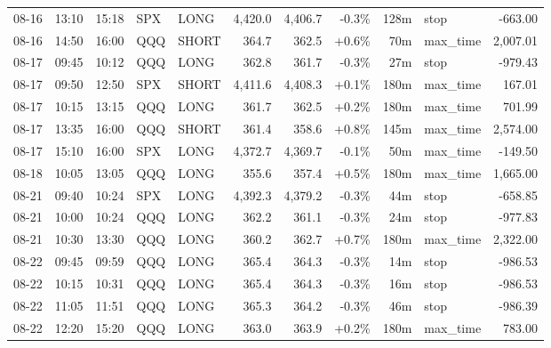 \documentclass[11pt,a4paper,twoside]{article}
\begin{document}
\begin{center}
\begin{longtable}{>{\color{txtmain}}l l l l l r r r r >{\color{txtmain}}l r}
08-16 & 13:10 & 15:18 & SPX & LONG & 4,420.0 & 4,406.7 & \textcolor{lossred}{-0.3\%} & 128m & stop & \textcolor{lossred}{-663.00} \\
08-16 & 14:50 & 16:00 & QQQ & SHORT & 364.7 & 362.5 & \textcolor{wingreen}{+0.6\%} & 70m & max\_time & \textcolor{wingreen}{2,007.01} \\
08-17 & 09:45 & 10:12 & QQQ & LONG & 362.8 & 361.7 & \textcolor{lossred}{-0.3\%} & 27m & stop & \textcolor{lossred}{-979.43} \\
08-17 & 09:50 & 12:50 & SPX & SHORT & 4,411.6 & 4,408.3 & \textcolor{wingreen}{+0.1\%} & 180m & max\_time & \textcolor{wingreen}{167.01} \\
08-17 & 10:15 & 13:15 & QQQ & LONG & 361.7 & 362.5 & \textcolor{wingreen}{+0.2\%} & 180m & max\_time & \textcolor{wingreen}{701.99} \\
08-17 & 13:35 & 16:00 & QQQ & SHORT & 361.4 & 358.6 & \textcolor{wingreen}{+0.8\%} & 145m & max\_time & \textcolor{wingreen}{2,574.00} \\
08-17 & 15:10 & 16:00 & SPX & LONG & 4,372.7 & 4,369.7 & \textcolor{lossred}{-0.1\%} & 50m & max\_time & \textcolor{lossred}{-149.50} \\
08-18 & 10:05 & 13:05 & QQQ & LONG & 355.6 & 357.4 & \textcolor{wingreen}{+0.5\%} & 180m & max\_time & \textcolor{wingreen}{1,665.00} \\
08-21 & 09:40 & 10:24 & SPX & LONG & 4,392.3 & 4,379.2 & \textcolor{lossred}{-0.3\%} & 44m & stop & \textcolor{lossred}{-658.85} \\
08-21 & 10:00 & 10:24 & QQQ & LONG & 362.2 & 361.1 & \textcolor{lossred}{-0.3\%} & 24m & stop & \textcolor{lossred}{-977.83} \\
08-21 & 10:30 & 13:30 & QQQ & LONG & 360.2 & 362.7 & \textcolor{wingreen}{+0.7\%} & 180m & max\_time & \textcolor{wingreen}{2,322.00} \\
08-22 & 09:45 & 09:59 & QQQ & LONG & 365.4 & 364.3 & \textcolor{lossred}{-0.3\%} & 14m & stop & \textcolor{lossred}{-986.53} \\
08-22 & 10:15 & 10:31 & QQQ & LONG & 365.4 & 364.3 & \textcolor{lossred}{-0.3\%} & 16m & stop & \textcolor{lossred}{-986.53} \\
08-22 & 11:05 & 11:51 & QQQ & LONG & 365.3 & 364.2 & \textcolor{lossred}{-0.3\%} & 46m & stop & \textcolor{lossred}{-986.39} \\
08-22 & 12:20 & 15:20 & QQQ & LONG & 363.0 & 363.9 & \textcolor{wingreen}{+0.2\%} & 180m & max\_time & \textcolor{wingreen}{783.00} \\

\end{longtable}
\end{center}
\end{document}
